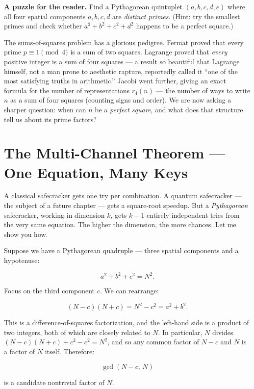 \textbf{A puzzle for the reader.} Find a Pythagorean quintuplet \((a, b, c, d, e)\) where all four spatial components \(a, b, c, d\) are \emph{distinct primes}. (Hint: try the smallest primes and check whether \(a^2 + b^2 + c^2 + d^2\) happens to be a perfect square.)

The sums-of-squares problem has a glorious pedigree. Fermat proved that every prime \(p \equiv 1 \pmod{4}\) is a sum of two squares. Lagrange proved that \emph{every} positive integer is a sum of four squares --- a result so beautiful that Lagrange himself, not a man prone to aesthetic rapture, reportedly called it ``one of the most satisfying truths in arithmetic.'' Jacobi went further, giving an exact formula for the number of representations \(r_4(n)\) --- the number of ways to write \(n\) as a sum of four squares (counting signs and order). We are now asking a sharper question: when can \(n\) be a \emph{perfect square}, and what does that structure tell us about its prime factors?



\section{The Multi-Channel Theorem --- One Equation, Many Keys}\label{ch6-the-multi-channel-theorem-one-equation-many-keys}

A classical safecracker gets one try per combination. A quantum safecracker --- the subject of a future chapter --- gets a square-root speedup. But a \emph{Pythagorean} safecracker, working in dimension \(k\), gets \(k - 1\) entirely independent tries from the very same equation. The higher the dimension, the more chances. Let me show you how.

Suppose we have a Pythagorean quadruple --- three spatial components and a hypotenuse:

\[a^2 + b^2 + c^2 = N^2.\]

Focus on the third component \(c\). We can rearrange:

\[(N - c)(N + c) = N^2 - c^2 = a^2 + b^2.\]

This is a difference-of-squares factorization, and the left-hand side is a product of two integers, both of which are closely related to \(N\). In particular, \(N\) divides \((N - c)(N + c) + c^2 - c^2 = N^2\), and so any common factor of \(N - c\) and \(N\) is a factor of \(N\) itself. Therefore:

\[\gcd(N - c, \, N)\]

is a candidate nontrivial factor of \(N\).

